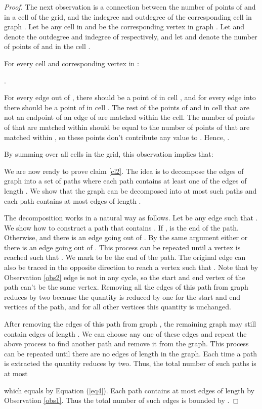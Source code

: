 \documentclass[oribibl]{llncs}
\begin{document}
\begin{proof}
The next observation is a connection between the number of points of  and 
in a cell of the grid, and the indegree and outdegree of the corresponding cell
in graph . Let  be any cell in  and  be the corresponding
vertex in graph . Let  and  denote the
outdegree and indegree of  respectively, and let  and 
denote the number of points of  and  in the cell .
\begin{observation}
For every cell  and corresponding vertex  in :

.
\end{observation}
For every edge out of ,
there should be a point of  in cell , and for every edge into  there
should be a point of  in cell . The rest of the points of  and 
in cell  that are not an endpoint of an edge of  are matched within
the cell. The number of points of  that are matched within  should be
equal to the number of points of  that are matched within , so these
points don't contribute any value to .
Hence, . 

By summing over all cells  in the grid, this observation implies that:


We are now ready to prove claim \ref{cl2}. The idea is
to decompose the edges of graph  into a
set of paths where each path contains at least one of the edges of length
.
We show that the graph  can be decomposed into at most
 such paths and each path contains at most 
edges of length .

The decomposition works in a natural way as follows.
Let  be any edge such that .
We show how to construct a path that contains .
If ,  is the end of the path. Otherwise,
 and there is an edge  going out of . By
the same argument either  or there is an edge going
out of . This process can be repeated until a vertex  is reached such
that . We mark  to be the end of the path.
The original edge  can also be traced in the opposite direction to
reach a vertex  such that .
Note that by Observation \ref{obs2}
edge  is not in any cycle, so the start and end vertex of the path can't
be the same vertex. Removing all the edges of this path from graph 
reduces  by two because
the quantity  is reduced by one 
for the start and end vertices of the path, and for all
other vertices this quantity is unchanged.

After removing the edges of this path from graph ,
the remaining graph may still contain
edges of length . We can choose any one of these edges and
repeat the above process to find another path and remove it from the graph.
This process can be repeated until there are no edges of length
 in the graph. Each time a path is extracted the quantity
 reduces by two. Thus, the total
number of such paths is at most

which equals  by Equation (\ref{eq4}).
Each path contains at most  edges of length 
by Observation \ref{obs1}. Thus the total number of such edges is
bounded by . 
\end{proof}
\end{document}

